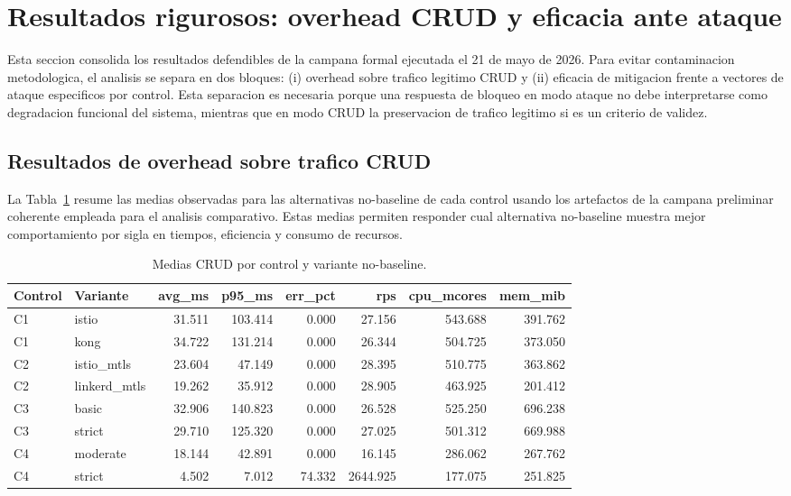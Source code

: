 \section{Resultados rigurosos: overhead CRUD y eficacia ante ataque}
\label{sec:resultados-rigurosos-20260521}

Esta seccion consolida los resultados defendibles de la campana formal ejecutada el 21 de mayo de 2026. Para evitar contaminacion metodologica, el analisis se separa en dos bloques: (i) overhead sobre trafico legitimo CRUD y (ii) eficacia de mitigacion frente a vectores de ataque especificos por control. Esta separacion es necesaria porque una respuesta de bloqueo en modo ataque no debe interpretarse como degradacion funcional del sistema, mientras que en modo CRUD la preservacion de trafico legitimo si es un criterio de validez.

\subsection{Resultados de overhead sobre trafico CRUD}

La Tabla~\ref{tab:crud-nonbaseline-means} resume las medias observadas para las alternativas no-baseline de cada control usando los artefactos de la campana preliminar coherente empleada para el analisis comparativo. Estas medias permiten responder cual alternativa no-baseline muestra mejor comportamiento por sigla en tiempos, eficiencia y consumo de recursos.

\begin{table}[htbp]
\centering
\small
\caption{Medias CRUD por control y variante no-baseline.}
\label{tab:crud-nonbaseline-means}
\begin{tabular}{llrrrrrr}
\toprule
Control & Variante & avg\_ms & p95\_ms & err\_pct & rps & cpu\_mcores & mem\_mib \\
\midrule
C1 & istio        & 31.511 & 103.414 & 0.000 & 27.156 & 543.688 & 391.762 \\
C1 & kong         & 34.722 & 131.214 & 0.000 & 26.344 & 504.725 & 373.050 \\
C2 & istio\_mtls  & 23.604 & 47.149  & 0.000 & 28.395 & 510.775 & 363.862 \\
C2 & linkerd\_mtls& 19.262 & 35.912  & 0.000 & 28.905 & 463.925 & 201.412 \\
C3 & basic        & 32.906 & 140.823 & 0.000 & 26.528 & 525.250 & 696.238 \\
C3 & strict       & 29.710 & 125.320 & 0.000 & 27.025 & 501.312 & 669.988 \\
C4 & moderate     & 18.144 & 42.891  & 0.000 & 16.145 & 286.062 & 267.762 \\
C4 & strict       & 4.502  & 7.012   & 74.332 & 2644.925 & 177.075 & 251.825 \\
\bottomrule
\end{tabular}
\end{table}

